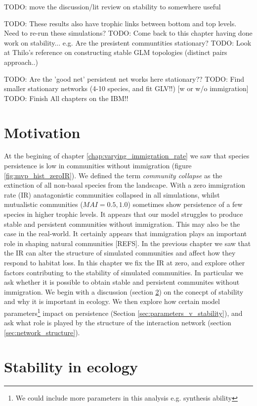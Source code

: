 TODO: move the discussion/lit review on stability to somewhere useful

TODO: These results also have trophic links between bottom and top levels. Need to re-run these simulations?
TODO: Come back to this chapter having done work on stability... e.g. Are the presistent communtities stationary?
TODO: Look at Thilo's reference on constructing stable GLM topologies (distinct pairs approach..)

TODO: Are the 'good net' persistent net works here stationary??
TODO: Find smaller stationary networks (4-10 species, and fit GLV!!) [w or w/o immigration]
TODO: Finish All chapters on the IBM!!

\section{Motivation}
\label{sec:motivate_stability}

At the begining of chapter \ref{chap:varying_immigration_rate} we saw that species persistence is low in communities without immigration (figure \ref{fig:mvp_hist_zeroIR}). We defined the term \emph{community collapse} as the extinction of all non-basal species from the landscape. With a zero immigration rate (IR) anatagonistic communities collapsed in all simulations, whilst mutualistic communities ($MAI=0.5,1.0$) sometimes show persistence of a few species in higher trophic levels. It appears that our model struggles to produce stable and persistent communities without immigration. This may also be the case in the real-world. It certainly appears that immigration plays an important role in shaping natural communities [REFS]. In the previous chapter we saw that the IR can alter the structure of simulated communities and affect how they respond to habitat loss. In this chapter we fix the IR at zero, and explore other factors contributing to the stability of simulated communities. In particular we ask whether it is possible to obtain stable and persistent communites without immigration. We begin with a discussion (section \ref{sec:lit_review_stability}) on the conecpt of stability and why it is important in ecology. We then explore how certain model parameters\footnote{We could include more parameters in this analysis e.g. synthesis ability} impact on persistence (Section \ref{sec:parameters_v_stability}), and ask what role is played by the structure of the interaction network (section \ref{sec:network_structure}).  

\section{Stability in ecology}
\label{sec:lit_review_stability}

